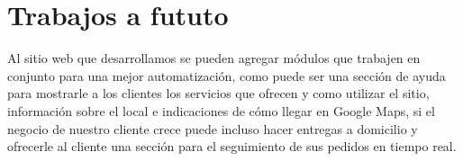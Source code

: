 \section{Trabajos a fututo}
Al sitio web que desarrollamos se pueden agregar módulos que trabajen en conjunto para una mejor automatización, como puede ser una sección de ayuda para mostrarle a los clientes los servicios que ofrecen y como utilizar el sitio, información sobre el local e indicaciones de cómo llegar en Google Maps, si el negocio de nuestro cliente crece puede incluso hacer entregas a domicilio y ofrecerle al cliente una sección para el seguimiento de sus pedidos en tiempo real.


